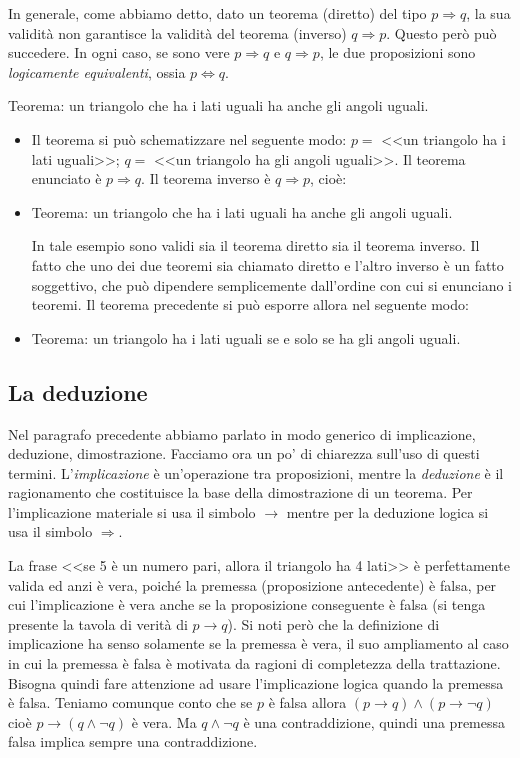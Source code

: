 {In generale, come abbiamo detto, dato un teorema (diretto) del tipo  $p\Rightarrow q$, la sua validità non garantisce la validità del teorema (inverso) $q\Rightarrow p$. Questo però può succedere. In ogni caso, se sono vere  $p\Rightarrow q$ e $q\Rightarrow p$, le due proposizioni sono \emph{logicamente equivalenti}, ossia  $p\Leftrightarrow q$.
\begin{exrig}
\begin{esempio}
Teorema: un triangolo che ha i lati uguali ha anche gli angoli uguali.
\begin{itemize}
\item Il teorema si può schematizzare nel seguente modo: $ p = $ <<un triangolo ha i lati uguali>>; $ q = $ <<un triangolo ha gli angoli uguali>>. Il teorema enunciato è  $p\Rightarrow q$. Il teorema inverso è  $q\Rightarrow p$, cioè:
\item Teorema: un triangolo che ha i lati uguali ha anche gli angoli uguali.

In tale esempio sono validi sia il teorema diretto sia il teorema inverso. Il fatto che uno dei due teoremi sia chiamato diretto e l'altro inverso è un fatto soggettivo, che può dipendere semplicemente dall'ordine con cui si enunciano i teoremi.
Il teorema precedente si può esporre allora nel seguente modo:
\item Teorema: un triangolo ha i lati uguali se e solo se ha gli angoli uguali.
\end{itemize}
\end{esempio}
\end{exrig}

\subsection{La deduzione}

Nel paragrafo precedente abbiamo parlato in modo generico di implicazione, deduzione, dimostrazione. Facciamo ora un po' di chiarezza sull'uso di questi termini. L'\emph{implicazione} è un'operazione tra proposizioni, mentre la \emph{deduzione} è il ragionamento che costituisce la base della dimostrazione di un teorema. Per l’implicazione materiale si usa il simbolo  $\to $ mentre per la deduzione logica si usa il simbolo  $\Rightarrow $.

La frase <<se 5 è un numero pari, allora il triangolo ha 4 lati>> è perfettamente valida ed anzi è vera, poiché la premessa (proposizione antecedente) è falsa, per cui l'implicazione è vera anche se la proposizione conseguente è falsa (si tenga presente la tavola di verità di  $p\to q$).
Si noti però che la definizione di implicazione ha senso solamente se la premessa è vera, il suo ampliamento al caso in cui la premessa è falsa è motivata da ragioni di completezza della trattazione. Bisogna quindi fare attenzione ad usare l'implicazione logica quando la premessa è falsa. Teniamo comunque conto che se $ p $ è falsa allora  $(p\to q)\wedge(p\to \neg q)$ cioè  $p\to (q\wedge \neg q)$ è vera. Ma  $q\wedge \neg q$ è una contraddizione, quindi una premessa falsa implica sempre una contraddizione.

}
